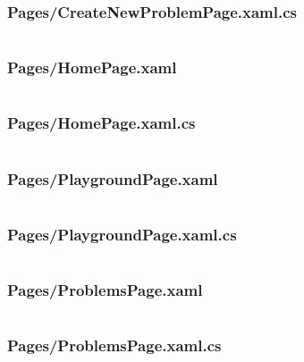 \documentclass[a4paper]{report}
\begin{document}
\inputminted{xml}{"../src/Algorithm Dynamics/Pages/CreateNewProblemPage.xaml"}

\subsubsection{Pages/CreateNewProblemPage.xaml.cs}

\inputminted{csharp}{"../src/Algorithm Dynamics/Pages/CreateNewProblemPage.xaml.cs"}

\subsubsection{Pages/HomePage.xaml}

\inputminted{xml}{"../src/Algorithm Dynamics/Pages/HomePage.xaml"}

\subsubsection{Pages/HomePage.xaml.cs}

\inputminted{csharp}{"../src/Algorithm Dynamics/Pages/HomePage.xaml.cs"}

\subsubsection{Pages/PlaygroundPage.xaml}

\inputminted{xml}{"../src/Algorithm Dynamics/Pages/PlaygroundPage.xaml"}

\subsubsection{Pages/PlaygroundPage.xaml.cs}

\inputminted{csharp}{"../src/Algorithm Dynamics/Pages/PlaygroundPage.xaml.cs"}

\subsubsection{Pages/ProblemsPage.xaml}
\label{subsubsec:problemspage}

\inputminted{xml}{"../src/Algorithm Dynamics/Pages/ProblemsPage.xaml"}

\subsubsection{Pages/ProblemsPage.xaml.cs}

\inputminted{csharp}{"../src/Algorithm Dynamics/Pages/ProblemsPage.xaml.cs"}
\end{document}
